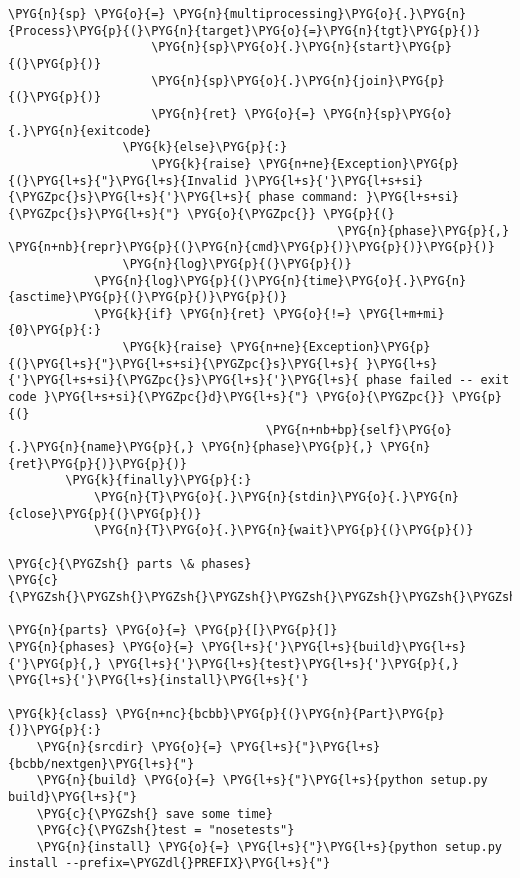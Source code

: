 \begin{Verbatim}[commandchars=\\\{\}]
                    \PYG{n}{sp} \PYG{o}{=} \PYG{n}{multiprocessing}\PYG{o}{.}\PYG{n}{Process}\PYG{p}{(}\PYG{n}{target}\PYG{o}{=}\PYG{n}{tgt}\PYG{p}{)}
                    \PYG{n}{sp}\PYG{o}{.}\PYG{n}{start}\PYG{p}{(}\PYG{p}{)}
                    \PYG{n}{sp}\PYG{o}{.}\PYG{n}{join}\PYG{p}{(}\PYG{p}{)}
                    \PYG{n}{ret} \PYG{o}{=} \PYG{n}{sp}\PYG{o}{.}\PYG{n}{exitcode}
                \PYG{k}{else}\PYG{p}{:}
                    \PYG{k}{raise} \PYG{n+ne}{Exception}\PYG{p}{(}\PYG{l+s}{"}\PYG{l+s}{Invalid }\PYG{l+s}{'}\PYG{l+s+si}{\PYGZpc{}s}\PYG{l+s}{'}\PYG{l+s}{ phase command: }\PYG{l+s+si}{\PYGZpc{}s}\PYG{l+s}{"} \PYG{o}{\PYGZpc{}} \PYG{p}{(}
                                              \PYG{n}{phase}\PYG{p}{,}             \PYG{n+nb}{repr}\PYG{p}{(}\PYG{n}{cmd}\PYG{p}{)}\PYG{p}{)}\PYG{p}{)}
                \PYG{n}{log}\PYG{p}{(}\PYG{p}{)}
            \PYG{n}{log}\PYG{p}{(}\PYG{n}{time}\PYG{o}{.}\PYG{n}{asctime}\PYG{p}{(}\PYG{p}{)}\PYG{p}{)}
            \PYG{k}{if} \PYG{n}{ret} \PYG{o}{!=} \PYG{l+m+mi}{0}\PYG{p}{:}
                \PYG{k}{raise} \PYG{n+ne}{Exception}\PYG{p}{(}\PYG{l+s}{"}\PYG{l+s+si}{\PYGZpc{}s}\PYG{l+s}{ }\PYG{l+s}{'}\PYG{l+s+si}{\PYGZpc{}s}\PYG{l+s}{'}\PYG{l+s}{ phase failed -- exit code }\PYG{l+s+si}{\PYGZpc{}d}\PYG{l+s}{"} \PYG{o}{\PYGZpc{}} \PYG{p}{(}
                                    \PYG{n+nb+bp}{self}\PYG{o}{.}\PYG{n}{name}\PYG{p}{,} \PYG{n}{phase}\PYG{p}{,} \PYG{n}{ret}\PYG{p}{)}\PYG{p}{)}
        \PYG{k}{finally}\PYG{p}{:}
            \PYG{n}{T}\PYG{o}{.}\PYG{n}{stdin}\PYG{o}{.}\PYG{n}{close}\PYG{p}{(}\PYG{p}{)}
            \PYG{n}{T}\PYG{o}{.}\PYG{n}{wait}\PYG{p}{(}\PYG{p}{)}

\PYG{c}{\PYGZsh{} parts \& phases}
\PYG{c}{\PYGZsh{}\PYGZsh{}\PYGZsh{}\PYGZsh{}\PYGZsh{}\PYGZsh{}\PYGZsh{}\PYGZsh{}\PYGZsh{}\PYGZsh{}\PYGZsh{}\PYGZsh{}\PYGZsh{}\PYGZsh{}\PYGZsh{}\PYGZsh{}}

\PYG{n}{parts} \PYG{o}{=} \PYG{p}{[}\PYG{p}{]}
\PYG{n}{phases} \PYG{o}{=} \PYG{l+s}{'}\PYG{l+s}{build}\PYG{l+s}{'}\PYG{p}{,} \PYG{l+s}{'}\PYG{l+s}{test}\PYG{l+s}{'}\PYG{p}{,} \PYG{l+s}{'}\PYG{l+s}{install}\PYG{l+s}{'}

\PYG{k}{class} \PYG{n+nc}{bcbb}\PYG{p}{(}\PYG{n}{Part}\PYG{p}{)}\PYG{p}{:}
    \PYG{n}{srcdir} \PYG{o}{=} \PYG{l+s}{"}\PYG{l+s}{bcbb/nextgen}\PYG{l+s}{"}
    \PYG{n}{build} \PYG{o}{=} \PYG{l+s}{"}\PYG{l+s}{python setup.py build}\PYG{l+s}{"}
    \PYG{c}{\PYGZsh{} save some time}
    \PYG{c}{\PYGZsh{}test = "nosetests"}
    \PYG{n}{install} \PYG{o}{=} \PYG{l+s}{"}\PYG{l+s}{python setup.py install --prefix=\PYGZdl{}PREFIX}\PYG{l+s}{"}


\end{Verbatim}
